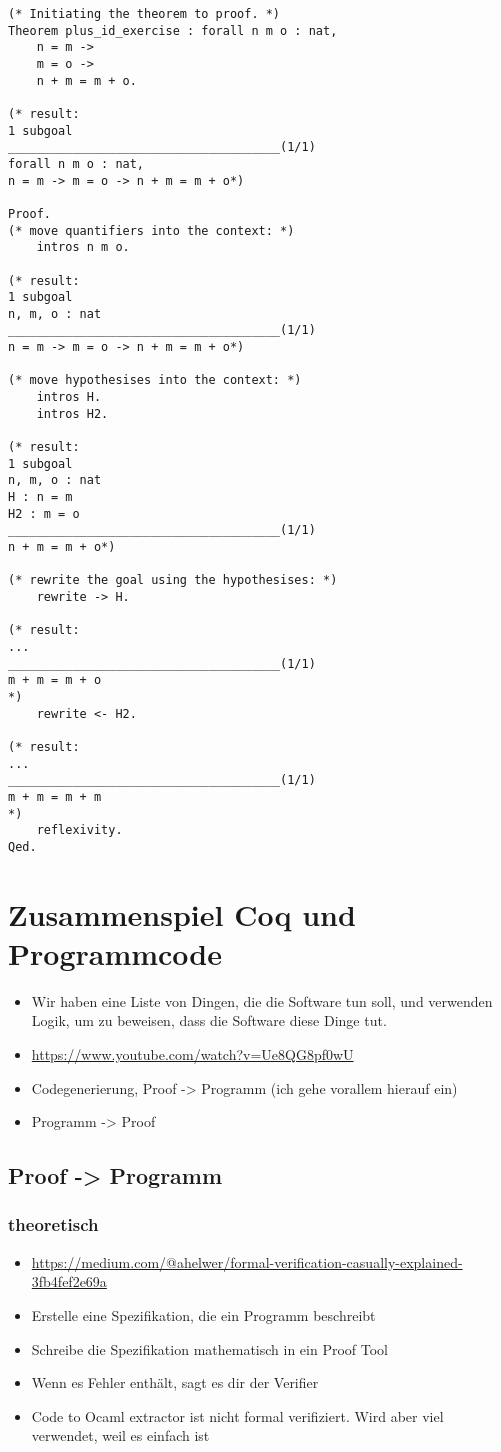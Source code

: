 \begin{lstlisting}[language=coq,firstnumber=1,caption=Coq Beispielbeweis,label=lst:sample-proof2]
(* Initiating the theorem to proof. *)
Theorem plus_id_exercise : forall n m o : nat,
	n = m ->
	m = o ->
	n + m = m + o.
	
(* result: 
1 subgoal
______________________________________(1/1)
forall n m o : nat,
n = m -> m = o -> n + m = m + o*)

Proof.
(* move quantifiers into the context: *)
	intros n m o. 
	
(* result: 
1 subgoal
n, m, o : nat
______________________________________(1/1)
n = m -> m = o -> n + m = m + o*)

(* move hypothesises into the context: *)	
	intros H.
	intros H2.

(* result: 
1 subgoal
n, m, o : nat
H : n = m
H2 : m = o
______________________________________(1/1)
n + m = m + o*)

(* rewrite the goal using the hypothesises: *)
	rewrite -> H.

(* result: 
...
______________________________________(1/1)
m + m = m + o
*)
	rewrite <- H2.

(* result:
...
______________________________________(1/1)
m + m = m + m
*)
	reflexivity.
Qed.
\end{lstlisting}

\section{Zusammenspiel Coq und Programmcode}
\begin{itemize}
	\item Wir haben eine Liste von Dingen, die die Software tun soll, und verwenden Logik, um zu beweisen, dass die Software diese Dinge tut.
	\item \url{https://www.youtube.com/watch?v=Ue8QG8pf0wU}
	\item Codegenerierung, Proof -> Programm (ich gehe vorallem hierauf ein)
	\item Programm -> Proof 
\end{itemize}

\subsection{Proof -> Programm}
\subsubsection{theoretisch}
\begin{itemize}
	\item \url{https://medium.com/@ahelwer/formal-verification-casually-explained-3fb4fef2e69a}
	\item Erstelle eine Spezifikation, die ein Programm beschreibt
	\item Schreibe die Spezifikation mathematisch in ein Proof Tool
	\item Wenn es Fehler enthält, sagt es dir der Verifier
	\item Code to Ocaml extractor ist nicht formal verifiziert. Wird aber viel verwendet, weil es einfach ist
\end{itemize}

